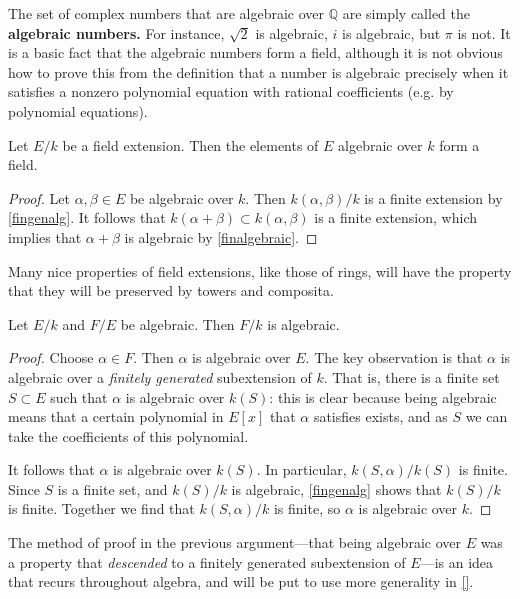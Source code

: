 The set of complex numbers that are algebraic over $\mathbb{Q}$ are simply
called the \textbf{algebraic numbers.} For instance, $\sqrt{2}$ is algebraic,
$i$ is algebraic, but $\pi$ is not.
It is a basic fact that the algebraic numbers form a field, although it is not
obvious how to prove this from the definition that a number is algebraic
precisely when it satisfies a nonzero polynomial equation with rational
coefficients (e.g. by polynomial equations).




\begin{corollary} 
Let $E/k$ be a field extension. Then the elements of $E$ algebraic over $k$
form a field.
\end{corollary} 
\begin{proof} 
Let $\alpha, \beta \in E$ be algebraic over 
$k$. Then $k(\alpha, \beta)/k$ is a finite extension by \cref{fingenalg}. It follows that $k(\alpha
+ \beta) \subset k(\alpha, \beta)$ is a finite extension, which implies that
$\alpha + \beta$ is algebraic by \cref{finalgebraic}.
\end{proof} 


Many nice properties of field extensions, like those of rings, will have the property
that they will be preserved by towers and composita.


\begin{proposition}[Towers]
Let $E/k$ and $F/E$ be algebraic. Then $F/k$ is algebraic.
\end{proposition} 
\begin{proof} 
Choose $\alpha \in F$. Then $\alpha$ is algebraic over $E$. 
The key observation is that $\alpha$ is algebraic over a \emph{finitely
generated} subextension of $k$.
That is, there is a finite set $S \subset E$ such that $\alpha $ is algebraic
over $k(S)$: this is clear because being algebraic means that a certain
polynomial in $E[x]$ that $\alpha$ satisfies exists, and as $S$ we can take the
coefficients of this polynomial.

It follows that $\alpha$ is algebraic over $k(S)$. In particular, $k(S,
\alpha)/ k(S)$ is finite. Since $S$ is a finite set, and $k(S)/k$ is algebraic,
\cref{fingenalg} shows that $k(S)/k$ is finite. Together we find that
$k(S,\alpha)/k$ is finite, so $\alpha$ is algebraic over $k$.
\end{proof} 

The method of proof in the previous argument---that being algebraic over $E$ was a
property that \emph{descended} to a finitely generated subextension of $E$---is
an idea that recurs throughout algebra, and will be put to use more generality
in \cref{}.

